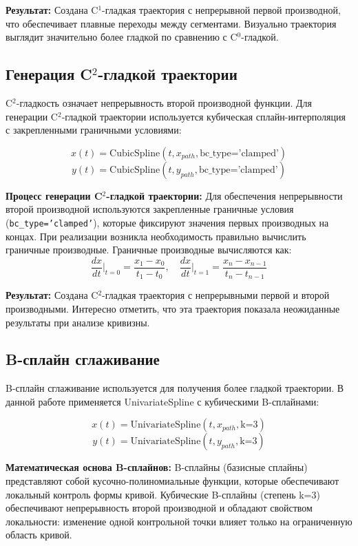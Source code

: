 \textbf{Результат:} Создана C$^1$-гладкая траектория с непрерывной первой производной, что обеспечивает плавные переходы между сегментами. Визуально траектория выглядит значительно более гладкой по сравнению с C$^0$-гладкой.

\subsection{Генерация C$^2$-гладкой траектории}

C$^2$-гладкость означает непрерывность второй производной функции. Для генерации C$^2$-гладкой траектории используется кубическая сплайн-интерполяция с закрепленными граничными условиями:

$$x(t) = \text{CubicSpline}(t, x_{path}, \text{bc\_type='clamped'})$$
$$y(t) = \text{CubicSpline}(t, y_{path}, \text{bc\_type='clamped'})$$

\textbf{Процесс генерации C$^2$-гладкой траектории:} Для обеспечения непрерывности второй производной используются закрепленные граничные условия (\texttt{bc\_type='clamped'}), которые фиксируют значения первых производных на концах. При реализации возникла необходимость правильно вычислить граничные производные. Граничные производные вычисляются как:
$$\frac{dx}{dt}\bigg|_{t=0} = \frac{x_1 - x_0}{t_1 - t_0}, \quad \frac{dx}{dt}\bigg|_{t=1} = \frac{x_n - x_{n-1}}{t_n - t_{n-1}}$$

\textbf{Результат:} Создана C$^2$-гладкая траектория с непрерывными первой и второй производными. Интересно отметить, что эта траектория показала неожиданные результаты при анализе кривизны.

\subsection{B-сплайн сглаживание}

B-сплайн сглаживание используется для получения более гладкой траектории. В данной работе применяется UnivariateSpline с кубическими B-сплайнами:

$$x(t) = \text{UnivariateSpline}(t, x_{path}, \text{k=3})$$
$$y(t) = \text{UnivariateSpline}(t, y_{path}, \text{k=3})$$

\textbf{Математическая основа B-сплайнов:} B-сплайны (базисные сплайны) представляют собой кусочно-полиномиальные функции, которые обеспечивают локальный контроль формы кривой. Кубические B-сплайны (степень k=3) обеспечивают непрерывность второй производной и обладают свойством локальности: изменение одной контрольной точки влияет только на ограниченную область кривой.

